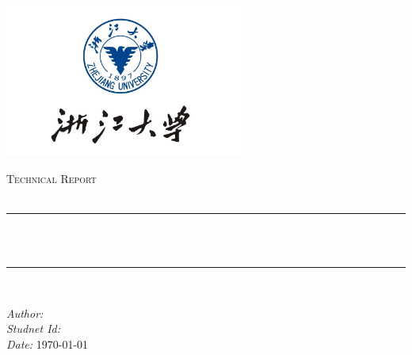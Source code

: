 \begin{titlepage}

    \newcommand{\HRule}{\rule{\linewidth}{0.5mm}} %
    
    \centering
    \includegraphics[width=8cm]{title/logo.png}\\[1cm] %
     
    
    \begin{center} %
    
    \textsc{\LARGE Technical Report}\\[2.0cm] 
    \textsc{\Large \CourseName{}}\\[0.5cm] 
    \end{center}
    \makeatletter
    \HRule \\[0.4cm]
    { \huge \bfseries \@title}\\[0.4cm] %
    \HRule \\[2.5cm]
    
    \begin{center}
    \emph{Author:} \@author\\[0.2cm] %
    \emph{Studnet Id:} \StudentId{}\\[0.2cm]
    \emph{Date:} \today\\[2cm] %
    \end{center}

    \vfill %
\end{titlepage}